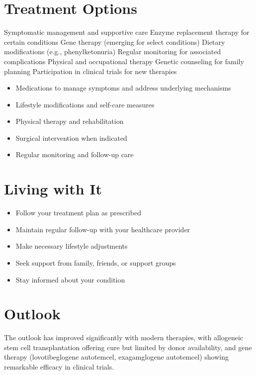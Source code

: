 \section{Treatment Options}
Symptomatic management and supportive care Enzyme replacement therapy for certain conditions Gene therapy (emerging for select conditions) Dietary modifications (e.g., phenylketonuria) Regular monitoring for associated complications Physical and occupational therapy Genetic counseling for family planning Participation in clinical trials for new therapies

\begin{itemize}[noitemsep]
  \item Medications to manage symptoms and address underlying mechanisms
  \item Lifestyle modifications and self-care measures
  \item Physical therapy and rehabilitation
  \item Surgical intervention when indicated
  \item Regular monitoring and follow-up care
\end{itemize}
\section{Living with It}
\begin{itemize}[noitemsep]
  \item Follow your treatment plan as prescribed
  \item Maintain regular follow-up with your healthcare provider
  \item Make necessary lifestyle adjustments
  \item Seek support from family, friends, or support groups
  \item Stay informed about your condition
\end{itemize}
\section{Outlook}
The outlook has improved significantly with modern therapies, with allogeneic stem cell transplantation offering cure but limited by donor availability, and gene therapy (lovotibeglogene autotemcel, exagamglogene autotemcel) showing remarkable efficacy in clinical trials.
